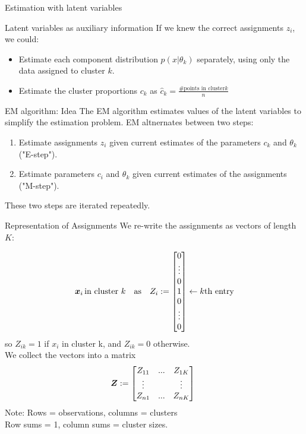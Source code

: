 \documentclass[10pt]{beamer}
\newcommand{\assign}{z} %
\newcommand{\Assign}{Z}
\begin{document}
\begin{frame}{Estimation with latent variables}

\begin{sblock}{Latent variables as auxiliary information}
If we knew the correct assignments $\assign_i$, we could:
\begin{itemize}
\item Estimate each component distribution $p(x|\theta_k)$ separately, using only the data assigned to cluster $k$.
\item Estimate the cluster proportions $c_k$ as $\widehat{c}_k = \frac{\text{\# points in cluster} k}{n}$
\end{itemize}

\end{sblock}
\begin{sblock}{EM algorithm: Idea}
The EM algorithm estimates values of the latent variables to simplify the estimation problem. EM altnernates between two steps:
\begin{enumerate}
\item Estimate assignments $\assign_i$  given current estimates of the parameters $c_k$ and $\theta_k$ ("E-step").
\item Estimate parameters $c_i$ and $\theta_k$ given current estimates of the assignments ("M-step").
\end{enumerate}

These two steps are iterated repeatedly.
\end{sblock}
\end{frame}


\begin{frame}{Representation of Assignments}
\footnotesize
We re-write the assignments as vectors of length $K$:

\[ \+x_i \, \text{in cluster } k \quad \text{as} \quad \Assign_i := 
\begin{bmatrix}
0  \\
\vdots  \\
0  \\
1 \\
0  \\
\vdots  \\
0 
\end{bmatrix} \leftarrow k\text{th entry}
 \]
 so $\Assign_{ik}=1$ if $x_i$ in cluster k, and $\Assign_{ik} =0$ otherwise. \\
 \vfill
 We collect the vectors into a matrix
 \[ 
 \+\Assign := 
\begin{bmatrix}
\Assign_{11} & ... &  \Assign_{1K}\\
\vdots & & \vdots \\
\Assign_{n1} & ... &  \Assign_{nK}\\
\end{bmatrix} \
 \]
Note: Rows = observations, columns = clusters \\
Row sums = 1, column sums = cluster sizes.
\end{frame}
\end{document}

